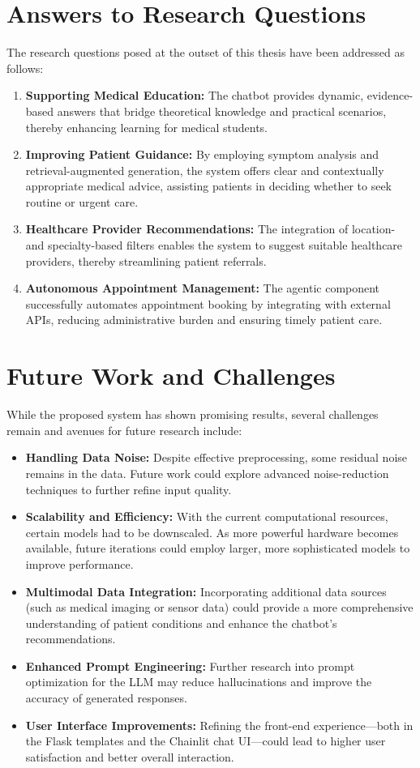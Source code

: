\section{Answers to Research Questions}
The research questions posed at the outset of this thesis have been addressed as follows:
\begin{enumerate}
    \item \textbf{Supporting Medical Education:} The chatbot provides dynamic, evidence-based answers that bridge theoretical knowledge and practical scenarios, thereby enhancing learning for medical students.
    \item \textbf{Improving Patient Guidance:} By employing symptom analysis and retrieval-augmented generation, the system offers clear and contextually appropriate medical advice, assisting patients in deciding whether to seek routine or urgent care.
    \item \textbf{Healthcare Provider Recommendations:} The integration of location- and specialty-based filters enables the system to suggest suitable healthcare providers, thereby streamlining patient referrals.
    \item \textbf{Autonomous Appointment Management:} The agentic component successfully automates appointment booking by integrating with external APIs, reducing administrative burden and ensuring timely patient care.
\end{enumerate}

\section{Future Work and Challenges}
While the proposed system has shown promising results, several challenges remain and avenues for future research include:
\begin{itemize}
    \item \textbf{Handling Data Noise:} Despite effective preprocessing, some residual noise remains in the data. Future work could explore advanced noise-reduction techniques to further refine input quality.
    \item \textbf{Scalability and Efficiency:} With the current computational resources, certain models had to be downscaled. As more powerful hardware becomes available, future iterations could employ larger, more sophisticated models to improve performance.
    \item \textbf{Multimodal Data Integration:} Incorporating additional data sources (such as medical imaging or sensor data) could provide a more comprehensive understanding of patient conditions and enhance the chatbot’s recommendations.
    \item \textbf{Enhanced Prompt Engineering:} Further research into prompt optimization for the LLM may reduce hallucinations and improve the accuracy of generated responses.
    \item \textbf{User Interface Improvements:} Refining the front-end experience—both in the Flask templates and the Chainlit chat UI—could lead to higher user satisfaction and better overall interaction.
\end{itemize}
\clearpage
